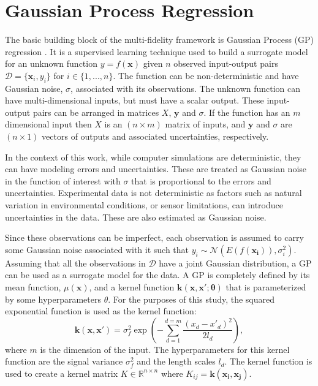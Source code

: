 \section{Gaussian Process Regression} \label{sec:gpr}
The basic building block of the multi-fidelity framework is Gaussian Process (GP) regression \cite{rasmussen_gaussian_2006}.
It is a supervised learning technique used to build a surrogate model for an unknown function $y = f(\mathbf{x})$ given $n$ observed input-output pairs $\mathcal{D} = \{\mathbf{x}_i, y_i\}$ for $i \in\{1,...,n\}$.
The function can be non-deterministic and have Gaussian noise, $\sigma$, associated with its observations.
The unknown function can have multi-dimensional inputs, but must have a scalar output. These input-output pairs can be arranged in matrices $X$, $\mathbf{y}$ and $\sigma$.
If the function has an $m$ dimensional input then $X$ is an $\left (n \times m \right)$ matrix of inputs, and $\mathbf{y}$ and $\sigma$ are $\left (n \times 1 \right)$ vectors of outputs and associated uncertainties, respectively.

In the context of this work, while computer simulations are deterministic, they can have modeling errors and uncertainties. 
These are treated as Gaussian noise in the function of interest with $\sigma$ that is proportional to the errors and uncertainties.
Experimental data is not deterministic as factors such as natural variation in environmental conditions, or sensor limitations, can introduce uncertainties in the data. 
These are also estimated as Gaussian noise.

Since these observations can be imperfect, each observation is assumed to carry some Gaussian noise associated with it such that $y_i \sim \mathcal{N}(E(f(\mathbf{x_i})),\sigma_i^2)$.
Assuming that all the observations in $\mathcal{D}$ have a joint Gaussian distribution, a GP can be used as a surrogate model for the data.
A GP is completely defined by its mean function, $ \mu(\mathbf{x}) $, and a kernel function $\mathbf{k}(\mathbf{x,x';\theta})$ that is parameterized by some hyperparameters $\theta$.
For the purposes of this study, the squared exponential function is used as the kernel function: 
\begin{equation}
    \mathbf{k}\left (\mathbf{x,x'} \right ) = \sigma_f^2 \exp \left ( -\sum_{d=1}^{d=m}\frac{\left ( x_d - x'_d \right )^2}{2l_d} \right ),
\end{equation}
where $m$ is the dimension of the input.
The hyperparameters for this kernel function are the signal variance $\sigma_f^2$ and the length scales $l_d$.
The kernel function is used to create a kernel matrix $K \in \mathbb{R} ^{ n \times n}$ where $K_{ij} = \mathbf{k \left( x_i, x_j \right )}$.

